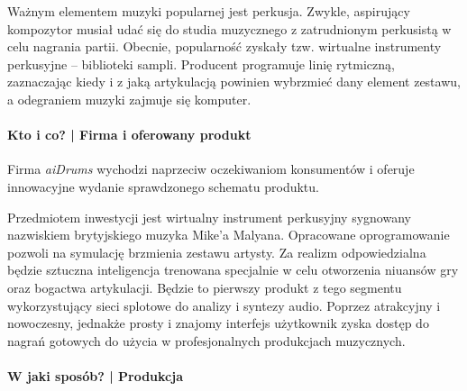 \documentclass[12pt]{article}
\newcommand{\nazwafirmy}{aiDrums\xspace}
\begin{document}
Ważnym elementem muzyki popularnej jest perkusja.
Zwykle, aspirujący kompozytor musiał udać się do studia muzycznego z zatrudnionym perkusistą w celu nagrania partii.
Obecnie, popularność zyskały tzw. wirtualne instrumenty perkusyjne -- biblioteki sampli.
Producent programuje linię rytmiczną, zaznaczając kiedy i z jaką artykulacją powinien wybrzmieć dany element zestawu, a odegraniem muzyki zajmuje się komputer.


\paragraph{Kto i co? | Firma i oferowany produkt}

Firma \textit{\nazwafirmy} wychodzi naprzeciw oczekiwaniom konsumentów i oferuje innowacyjne wydanie sprawdzonego schematu produktu.

Przedmiotem inwestycji jest wirtualny instrument perkusyjny sygnowany nazwiskiem brytyjskiego muzyka Mike'a Malyana.
Opracowane oprogramowanie pozwoli na symulację brzmienia zestawu artysty.
Za realizm odpowiedzialna będzie sztuczna inteligencja trenowana specjalnie w celu otworzenia niuansów gry oraz bogactwa artykulacji.
Będzie to pierwszy produkt z tego segmentu wykorzystujący sieci splotowe do analizy i syntezy audio.
Poprzez atrakcyjny i nowoczesny, jednakże prosty i znajomy interfejs użytkownik zyska dostęp do nagrań gotowych do użycia w profesjonalnych produkcjach muzycznych.

\paragraph{W jaki sposób? | Produkcja}
\end{document}
